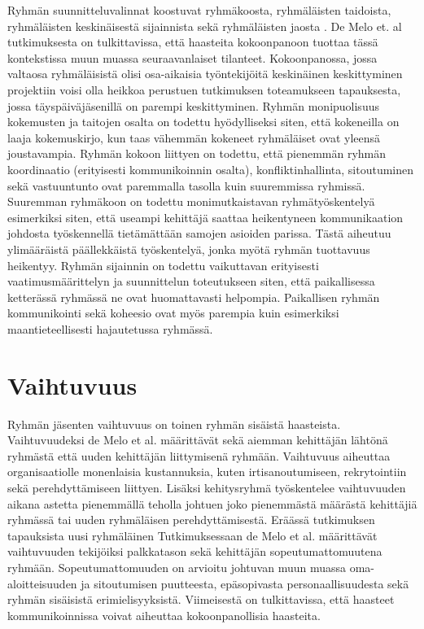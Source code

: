 Ryhmän suunnitteluvalinnat koostuvat ryhmäkoosta, ryhmäläisten taidoista, ryhmäläisten keskinäisestä sijainnista sekä ryhmäläisten jaosta \cite{DEOMELO2013412}. De Melo et. al \cite{DEOMELO2013412} tutkimuksesta on tulkittavissa, että haasteita kokoonpanoon tuottaa tässä kontekstissa muun muassa seuraavanlaiset tilanteet. Kokoonpanossa, jossa valtaosa ryhmäläisistä olisi osa-aikaisia työntekijöitä keskinäinen keskittyminen projektiin voisi olla heikkoa perustuen tutkimuksen toteamukseen tapauksesta, jossa täyspäiväjäsenillä on parempi keskittyminen. Ryhmän monipuolisuus kokemusten ja taitojen osalta on todettu hyödylliseksi siten, että kokeneilla on laaja kokemuskirjo, kun taas vähemmän kokeneet ryhmäläiset ovat yleensä joustavampia. Ryhmän kokoon liittyen on todettu, että pienemmän ryhmän koordinaatio (erityisesti kommunikoinnin osalta), konfliktinhallinta, sitoutuminen sekä vastuuntunto ovat paremmalla tasolla kuin suuremmissa ryhmissä. Suuremman ryhmäkoon on todettu monimutkaistavan ryhmätyöskentelyä esimerkiksi siten, että useampi kehittäjä saattaa heikentyneen kommunikaation johdosta työskennellä tietämättään samojen asioiden parissa. Tästä aiheutuu ylimääräistä päällekkäistä työskentelyä, jonka myötä ryhmän tuottavuus heikentyy. Ryhmän sijainnin on todettu vaikuttavan erityisesti vaatimusmäärittelyn ja suunnittelun toteutukseen siten, että paikallisessa ketterässä ryhmässä ne ovat huomattavasti helpompia. Paikallisen ryhmän kommunikointi sekä koheesio ovat myös parempia kuin esimerkiksi maantieteellisesti hajautetussa ryhmässä.

\section{Vaihtuvuus}

Ryhmän jäsenten vaihtuvuus on toinen ryhmän sisäistä haasteista. Vaihtuvuudeksi de Melo et al. \cite{DEOMELO2013412} määrittävät sekä aiemman kehittäjän lähtönä ryhmästä että uuden kehittäjän liittymisenä ryhmään. Vaihtuvuus aiheuttaa organisaatiolle monenlaisia kustannuksia, kuten irtisanoutumiseen, rekrytointiin sekä perehdyttämiseen liittyen. Lisäksi kehitysryhmä työskentelee vaihtuvuuden aikana astetta pienemmällä teholla johtuen joko pienemmästä määrästä kehittäjiä ryhmässä tai uuden ryhmäläisen perehdyttämisestä. Eräässä tutkimuksen tapauksista uusi ryhmäläinen  Tutkimuksessaan de Melo et al. määrittävät vaihtuvuuden tekijöiksi palkkatason sekä kehittäjän sopeutumattomuutena ryhmään. Sopeutumattomuuden on arvioitu johtuvan muun muassa oma-aloitteisuuden ja sitoutumisen puutteesta, epäsopivasta personaallisuudesta sekä ryhmän sisäisistä erimielisyyksistä. Viimeisestä on tulkittavissa, että haasteet kommunikoinnissa voivat aiheuttaa kokoonpanollisia haasteita. 

